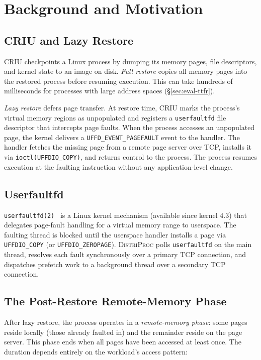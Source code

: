 \documentclass[journal]{IEEEtran}
\newcommand{\distriproc}{\textsc{DistriProc}\xspace}
\newcommand{\uffd}{\texttt{userfaultfd}\xspace}
\begin{document}
\section{Background and Motivation}
\label{sec:background}

\subsection{CRIU and Lazy Restore}

CRIU checkpoints a Linux process by dumping its memory pages, file
descriptors, and kernel state to an image on disk. \emph{Full restore}
copies all memory pages into the restored process before resuming
execution. This can take hundreds of milliseconds for processes with large
address spaces (\S\ref{sec:eval-ttfr}).

\emph{Lazy restore} defers page transfer. At restore time, CRIU marks the
process's virtual memory regions as unpopulated and registers a \uffd file
descriptor that intercepts page faults. When the process accesses an
unpopulated page, the kernel delivers a \texttt{UFFD\_EVENT\_PAGEFAULT}
event to the handler. The handler fetches the missing page from a remote
page server over TCP, installs it via \texttt{ioctl(UFFDIO\_COPY)}, and
returns control to the process. The process resumes execution at the
faulting instruction without any application-level change.

\subsection{Userfaultfd}

\texttt{userfaultfd(2)}~\cite{userfaultfd, corbet2015userfaultfd} is a Linux kernel
mechanism (available since kernel 4.3) that delegates page-fault handling
for a virtual memory range to userspace. The faulting thread is blocked
until the userspace handler installs a page via \texttt{UFFDIO\_COPY} (or
\texttt{UFFDIO\_ZEROPAGE}). \distriproc polls \uffd on the main thread,
resolves each fault synchronously over a primary TCP connection, and
dispatches prefetch work to a background thread over a secondary TCP
connection.

\subsection{The Post-Restore Remote-Memory Phase}

After lazy restore, the process operates in a \emph{remote-memory phase}:
some pages reside locally (those already faulted in) and the remainder
reside on the page server. This phase ends when all pages have been
accessed at least once. The duration depends entirely on the workload's
access pattern:
\end{document}
